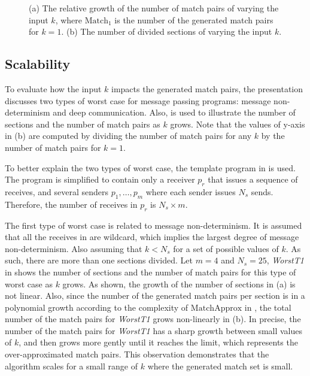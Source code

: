 \begin{figure}[!h]
\begin{minipage}{.55\textwidth}
\end{minipage}

\caption{(a) The relative growth of the number of match pairs of varying the input $k$, where $\mathrm{Match}_1$ is the number of the generated match pairs for $k=1$. (b) The number of divided sections of varying the input $k$.}
\label{fig:relation}
\end{figure}

\subsection{Scalability}
To evaluate how the input $k$ impacts the generated match pairs, the presentation discusses two types of worst case for message passing programs: message non-determinism and deep communication. Also,  is used to illustrate the number of sections and the number of match pairs as $k$ grows. Note that the values of y-axis in  (b) are computed by dividing the number of match pairs for any $k$ by the number of match pairs for $k=1$.

To better explain the two types of worst case, the template program in  is used. The program is simplified to contain only a receiver $p_r$ that issues a sequence of receives, and several senders $p_1,\ldots,p_m$ where each sender issues $N_s$ sends. Therefore, the number of receives in $p_r$ is $N_s\times m$.

\examplefigtemplate

The first type of worst case is related to message non-determinism. 
It is assumed that all the receives in  are wildcard, which implies the largest degree of message non-determinism. Also assuming that $k < N_s$ for a set of possible values of $k$. As such, there are more than one sections divided. Let $m=4$ and $N_s = 25$, \textit{WorstT1} in  shows the number of sections and the number of match pairs for this type of worst case as $k$ grows. As shown, the growth of the number of sections in  (a) is not linear. Also, since the number of the generated match pairs per section is in a polynomial growth according to the complexity of $\mathrm{MatchApprox}$ in , the total number of the match pairs for \textit{WorstT1} grows non-linearly in  (b). In precise, the number of the match pairs for \textit{WorstT1} has a sharp growth between small values of $k$, and then grows more gently until it reaches the limit, which represents the over-approximated match pairs. This observation demonstrates that the algorithm scales for a small range of $k$ where the generated match set is small.


